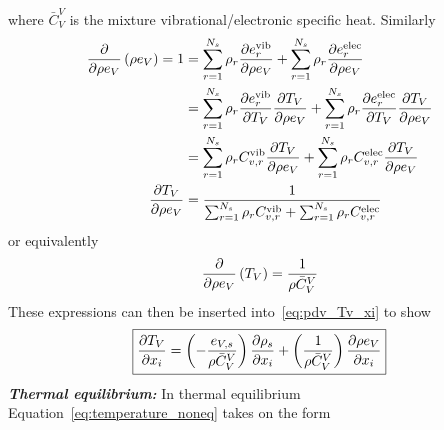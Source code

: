 where $\bar{C}_V^V$ is the mixture vibrational/electronic specific heat. Similarly
\begin{align*}
  {\frac{\partial{}}{\partial{\rho e_V}}}\left(\rho e_V\right) = 1 &= \sum_{r=1}^{N_s} \rho_r {\frac{\partial{e^{\text{vib}}_r}}{\partial{\rho e_V}}} + \sum_{r=1}^{N_s} \rho_r {\frac{\partial{e^{\text{elec}}_r}}{\partial{\rho e_V}}} \\
                                            &= \sum_{r=1}^{N_s} \rho_r {\frac{\partial{e^{\text{vib}}_r}}{\partial{T_V}}}{\frac{\partial{T_V}}{\partial{\rho e_V}}} + \sum_{r=1}^{N_s} \rho_r {\frac{\partial{e^{\text{elec}}_r}}{\partial{T_V}}}{\frac{\partial{T_V}}{\partial{\rho e_V}}} \\
                                            &= \sum_{r=1}^{N_s} \rho_r C^{\text{vib}}_{v,r}{\frac{\partial{T_V}}{\partial{\rho e_V}}} + \sum_{r=1}^{N_s} \rho_r C^{\text{elec}}_{v,r}{\frac{\partial{T_V}}{\partial{\rho e_V}}} \\
                          {\frac{\partial{T_V}}{\partial{\rho e_V}}} &= \frac{1}{\sum_{r=1}^{N_s} \rho_r C^{\text{vib}}_{v,r} + \sum_{r=1}^{N_s} \rho_r C^{\text{elec}}_{v,r}}
\end{align*}
or equivalently
\begin{equation}
  {\frac{\partial{}}{\partial{\rho e_V}}}\left(T_V\right) = \frac{1}{\rho \bar{C}_V^V}
\end{equation}
These expressions can then be inserted into~\eqref{eq:pdv_Tv_xi} to show
\begin{equation}
  \boxed{{\frac{\partial{T_V}}{\partial{x_i}}} = \left(-\frac{e_{V,s}}{\rho \bar{C}_V^V}\right){\frac{\partial{\rho_s}}{\partial{x_i}}} + \left(\frac{1}{\rho \bar{C}_V^V}\right){\frac{\partial{\rho e_V}}{\partial{x_i}}}}
\end{equation}
\textbf{\emph{Thermal equilibrium:}}
In thermal equilibrium Equation~\eqref{eq:temperature_noneq} takes on the form


